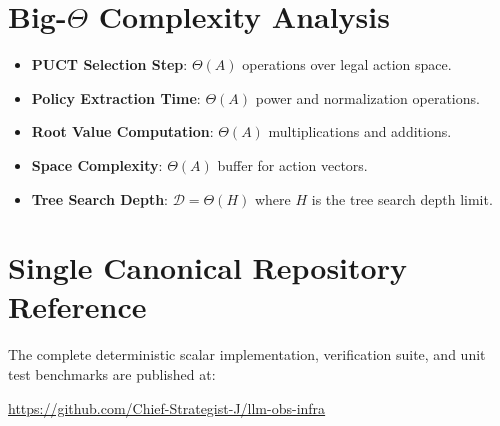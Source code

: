\documentclass[11pt,a4paper]{article}
\theoremstyle{definition}
\begin{document}
\section{Big-$\Theta$ Complexity Analysis}

\begin{itemize}
    \item \textbf{PUCT Selection Step}: $\Theta(A)$ operations over legal action space.
    \item \textbf{Policy Extraction Time}: $\Theta(A)$ power and normalization operations.
    \item \textbf{Root Value Computation}: $\Theta(A)$ multiplications and additions.
    \item \textbf{Space Complexity}: $\Theta(A)$ buffer for action vectors.
    \item \textbf{Tree Search Depth}: $\mathcal{D} = \Theta(H)$ where $H$ is the tree search depth limit.
\end{itemize}

\section{Single Canonical Repository Reference}

The complete deterministic scalar implementation, verification suite, and unit test benchmarks are published at:
\begin{center}
\url{https://github.com/Chief-Strategist-J/llm-obs-infra}
\end{center}
\end{document}
